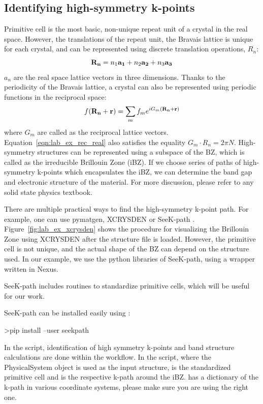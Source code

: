 \subsection{Identifying high-symmetry k-points}\label{sec:lab_ex_highk}
Primitive cell is the most basic, non-unique repeat unit of a crystal in the real space. 
However, the translations of the repeat unit, the Bravais lattice is unique for each crystal, and can be represented using discrete translation operations, $R_n$:
\begin{equation}
{\bf R_n} = n_1{\bf a_1} + n_2{\bf a_2} + n_3{\bf a_3}
\end{equation}
$a_n$ are the real space lattice vectors in three dimensions. Thanks to the periodicity of the Bravais lattice, a crystal can also be represented using periodic functions in the reciprocal space:
\begin{equation}
f({\bf R_n + r})= \sum_{m}f_me^{iG_m({\bf R_n+r})}\label{eqn:lab_ex_rec_real}
\end{equation}
where $G_m$ are called as the reciprocal lattice vectors. Equation~\ref{eqn:lab_ex_rec_real} also satisfies the equality $G_m\cdot{R_n}=2{\pi}N$. High-symmetry structures can be represented using a subspace of the BZ, which is called as the irreducible Brillouin Zone (iBZ). If we choose series of  paths of high-symmetry k-points which encapsulates the iBZ, we can determine the band gap and electronic structure of the material. For more discussion, please refer to any solid state physics textbook. 

There are multiple practical ways to find the high-symmetry k-point path. 
For example, one can use pymatgen, \cite{Ong2013} XCRYSDEN \cite{Kokalj1999} or SeeK-path \cite{Hinuma2017}. 
Figure~\ref{fig:lab_ex_xcrysden} shows the procedure for visualizing the Brillouin Zone using XCRYSDEN after the structure file is loaded. 
However, the primitive cell is not unique, and the actual shape of the BZ can depend on the structure used. 
In our example, we use the python libraries of SeeK-path, using a wrapper written in Nexus. 

SeeK-path includes routines to standardize primitive cells, which will be useful for our work.

SeeK-path can be installed easily using :
\begin{shade}
>pip install --user seekpath
\end{shade}
 
In the  script, identification of high symmetry k-points and band structure calculations are done within the workflow. 
In the script, where the  PhysicalSystem object is used as the input structure,  is the standardized primitive cell and  is the respective k-path around the iBZ. 
 has a dictionary of the k-path in various coordinate systems, please make sure you are using the right one. 

